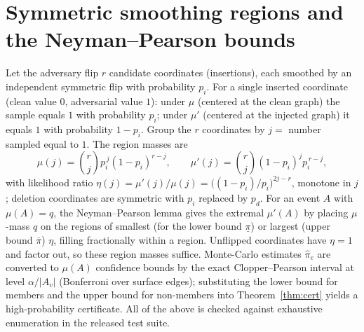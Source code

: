\documentclass[11pt]{article}
\begin{document}
\section{Symmetric smoothing regions and the Neyman--Pearson bounds}
Let the adversary flip $r$ candidate coordinates (insertions), each smoothed by an
independent symmetric flip with probability $p_i$. For a single inserted
coordinate (clean value $0$, adversarial value $1$): under $\mu$ (centered at the
clean graph) the sample equals $1$ with probability $p_i$; under $\mu'$ (centered
at the injected graph) it equals $1$ with probability $1-p_i$. Group the $r$
coordinates by $j=$ number sampled equal to $1$. The region masses are
\[
  \mu(j)=\binom{r}{j}p_i^{\,j}(1-p_i)^{r-j},\qquad
  \mu'(j)=\binom{r}{j}(1-p_i)^{j}p_i^{\,r-j},
\]
with likelihood ratio $\eta(j)=\mu'(j)/\mu(j)=\big((1-p_i)/p_i\big)^{2j-r}$,
monotone in $j$; deletion coordinates are symmetric with $p_i$ replaced by $p_d$.
For an event $A$ with $\mu(A)=q$, the Neyman--Pearson lemma gives the extremal
$\mu'(A)$ by placing $\mu$-mass $q$ on the regions of smallest (for the lower
bound $\underline\pi$) or largest (upper bound $\overline\pi$) $\eta$, filling
fractionally within a region. Unflipped coordinates have $\eta=1$ and factor out,
so these region masses suffice. Monte-Carlo estimates $\hat\pi_e$ are converted to
$\mu(A)$ confidence bounds by the exact Clopper--Pearson interval at level
$\alpha/|A_v|$ (Bonferroni over surface edges); substituting the lower bound for
members and the upper bound for non-members into Theorem~\ref{thm:cert} yields a
high-probability certificate. All of the above is checked against exhaustive
enumeration in the released test suite.



\end{document}
